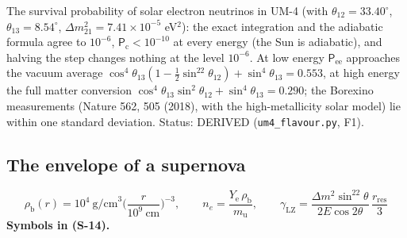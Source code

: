 \documentclass[
  10pt,
]{article}
\begin{document}
The survival probability of solar electron neutrinos in UM-4 (with
\(\theta_{12} = 33.40^\circ\), \(\theta_{13} = 8.54^\circ\),
\(\Delta m^2_{21} = 7.41\times10^{-5}\) eV\(^2\)): the exact integration
and the adiabatic formula agree to \(10^{-6}\),
\(\mathsf{P}_{\mathrm{c}} < 10^{-10}\) at every energy (the Sun is
adiabatic), and halving the step changes nothing at the level
\(10^{-6}\). At low energy \(\mathsf{P}_{\mathrm{ee}}\) approaches the
vacuum average
\(\cos^4\theta_{13}(1 - \frac12\sin^22\theta_{12}) + \sin^4\theta_{13} = 0.553\),
at high energy the full matter conversion
\(\cos^4\theta_{13}\sin^2\theta_{12} + \sin^4\theta_{13} = 0.290\); the
Borexino measurements (Nature 562, 505 (2018), with the high-metallicity
solar model) lie within one standard deviation. Status: DERIVED
(\texttt{um4\_flavour.py}, F1).

\hypertarget{the-envelope-of-a-supernova}{%
\subsection{The envelope of a
supernova}\label{the-envelope-of-a-supernova}}

\[
\rho_{\mathrm{b}}(r) = 10^4\ \text{g/cm}^3\Big(\frac{r}{10^9\ \text{cm}}\Big)^{-3},\qquad n_e = \frac{Y_{\mathrm{e}}\,\rho_{\mathrm{b}}}{m_{\mathrm{u}}},\qquad
\gamma_{\mathrm{LZ}} = \frac{\Delta m^2\sin^22\theta}{2E\cos2\theta}\,\frac{r_{\mathrm{res}}}{3} \tag{S-14}
\] \textbf{Symbols in (S-14).}
\end{document}
